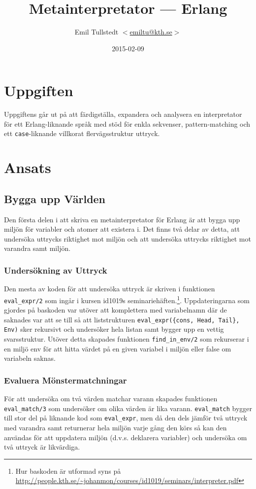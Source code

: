 \documentclass[a4paper, 11pt]{article}
\title{Metainterpretator --- Erlang}
\author{Emil Tullstedt \href{mailto:emiltu@kth.se}{$<$emiltu@kth.se$>$}}
\date{2015-02-09}
\begin{document}
\maketitle

\section{Uppgiften}

Uppgiftens går ut på att färdigställa, expandera och analysera en interpretator för ett Erlang-liknande språk med stöd för enkla sekvenser, pattern-matching och ett \texttt{case}-liknande villkorat flervägsstruktur uttryck.

\section{Ansats}

\subsection{Bygga upp Världen}
Den första delen i att skriva en metainterpretator för Erlang är att bygga upp miljön för variabler och atomer att existera i. Det finns två delar av detta, att under\-söka uttrycks riktighet mot miljön och att und\-er\-söka uttrycks riktighet mot varandra samt miljön.

\subsubsection{Undersökning av Uttryck}
Den mesta av koden för att undersöka uttryck är skriven i funktionen \texttt{eval_expr/2} som ingår i kursen id1019s seminariehäften.\footnote{Hur baskoden är utformad syns på \url{http://people.kth.se/~johanmon/courses/id1019/seminars/interpreter.pdf}}. Uppdateringarna som gjordes på baskoden var utöver att komplettera med variabelnamn där de saknades var att se till så att liststrukturen \lstinline$eval_expr({cons, Head, Tail}, Env)$ sker rekursivt och undersöker hela listan samt bygger upp en vettig svarsstruktur. Utöver detta skapades funktionen \texttt{find_in_env/2} som rekurserar i en miljö env för att hitta värdet på en given variabel i miljön eller false om variabeln saknas.

\subsubsection{Evaluera Mönstermatchningar}
För att undersöka om två värden matchar varann skapades funktionen \texttt{eval_match/3} som undersöker om olika värden är lika varann. \texttt{eval_match} bygger till stor del på liknande kod som \texttt{eval_expr}, men då den dels jämför två uttryck med varandra samt returnerar hela miljön varje gång den körs så kan den användas för att uppdatera miljön (d.v.s. deklarera variabler) och undersöka om två uttryck är likvärdiga.
\end{document}
